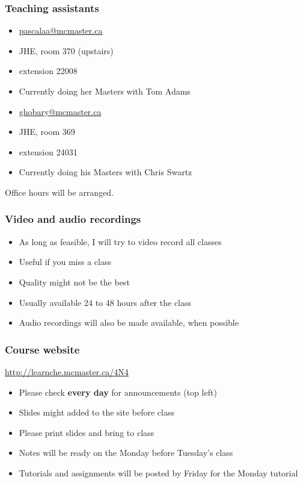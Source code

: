 \begin{frame}\frametitle{Teaching assistants}
	{\color{myGreen}{Alicia Pascall }}
	\begin{itemize}
		\item	\url{pascalaa@mcmaster.ca}
		\item	JHE, room 370 (upstairs)
		\item	extension 22008
		\item	Currently doing her Masters with Tom Adams
	\end{itemize}
	{\color{myGreen}{Yasser Ghobara}}
	\begin{itemize}
		\item	\url{ghobary@mcmaster.ca}
		\item	JHE, room 369
		\item	extension 24031
		\item	Currently doing his Masters with Chris Swartz
	\end{itemize}
	\vspace{12pt}
	Office hours will be arranged.
\end{frame}

\begin{frame}\frametitle{Video and audio recordings}
	\begin{itemize}
		\item	As long as feasible, I will try to video record all classes
		\item	Useful if you miss a class
		\item	Quality might not be the best
		\item	Usually available 24 to 48 hours after the class
		\item	Audio recordings will also be made available, when possible
	\end{itemize}
\end{frame}

\begin{frame}\frametitle{Course website}	
	\begin{exampleblock}{}
		\centering 
		\href{http://learnche.mcmaster.ca/4N4}{http://learnche.mcmaster.ca/4N4}
	\end{exampleblock}
	\begin{itemize}
		\item	Please check \textbf{every day} for announcements (top left)
		\item	Slides might added to the site before class
		\item	Please print slides and bring to class
		\item	Notes will be ready on the Monday before Tuesday's class
		\item	Tutorials and assignments will be posted by Friday for the Monday tutorial
	\end{itemize}
\end{frame}

